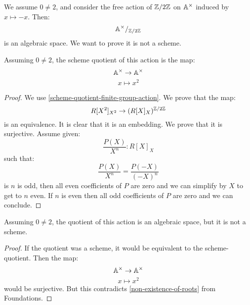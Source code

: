 We assume $0\not=2$, and consider the free action of $\mathbb{Z}/2\mathbb{Z}$ on $\mathbb{A}^\times$ induced by $x\mapsto -x$. Then:
\[\mathbb{A}^\times /_{\mathbb{Z}/2\mathbb{Z}} \]
is an algebraic space. We want to prove it is not a scheme.

\begin{lemma}\label{scheme-quotient-Ax-Z2Z}
Assuming $0\not=2$, the scheme quotient of this action is the map:
\[\mathbb{A}^\times \to \mathbb{A}^\times\]
\[x\mapsto x^2\]
\end{lemma}

\begin{proof}
We use \cref{scheme-quotient-finite-group-action}. We prove that the map:
\[R[X^2]_{X^2} \to (R[X]_X)^{\mathbb{Z}/2\mathbb{Z}} \]
is an equivalence. It is clear that it is an embedding. We prove that it is surjective. Assume given:
\[\frac{P(X)}{X^n} : R[X]_X\]
such that:
\[\frac{P(X)}{X^n} = \frac{P(-X)}{(-X)^n} \]
is $n$ is odd, then all even coefficients of $P$ are zero and we can simplify by $X$ to get to $n$ even. If $n$ is even then all odd coefficients of $P$ are zero and we can conclude.
\end{proof}

\begin{proposition}
Assuming $0\not=2$, the quotient of this action is an algebraic space, but it is not a scheme.
\end{proposition}

\begin{proof}
If the quotient was a scheme, it would be equivalent to the scheme-quotient. Then the map:
\[\mathbb{A}^\times\to\mathbb{A}^\times\]
\[x\mapsto x^2\]
would be surjective. But this contradicts \cref{non-existence-of-roots} from Foundations.
\end{proof}

